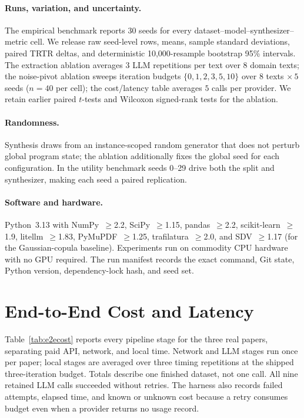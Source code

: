 \documentclass[letterpaper]{article} %
\begin{document}
\paragraph{Runs, variation, and uncertainty.} The empirical benchmark reports
30 seeds for every dataset--model--synthesizer--metric cell. We release raw
seed-level rows, means, sample standard deviations, paired TRTR deltas, and
deterministic 10,000-resample bootstrap 95\% intervals. The extraction ablation
averages $3$ LLM repetitions per text over $8$ domain texts; the noise-pivot ablation sweeps
iteration budgets $\{0,1,2,3,5,10\}$ over $8$ texts $\times\,5$ seeds
($n{=}40$ per cell); the cost/latency table averages $5$ calls per provider. We
retain earlier paired $t$-tests and Wilcoxon signed-rank tests for the ablation.

\paragraph{Randomness.} Synthesis draws from an instance-scoped random generator
that does not perturb global program state; the ablation additionally fixes the
global seed for each configuration. In the utility benchmark seeds 0--29 drive
both the split and synthesizer, making each seed a paired replication.

\paragraph{Software and hardware.} Python~3.13 with NumPy~$\ge$2.2,
SciPy~$\ge$1.15, pandas~$\ge$2.2, scikit-learn~$\ge$1.9, litellm~$\ge$1.83,
PyMuPDF~$\ge$1.25, trafilatura~$\ge$2.0, and SDV~$\ge$1.17 (for the
Gaussian-copula baseline). Experiments run on commodity CPU hardware with no GPU
required. The run manifest records the exact command, Git state, Python
version, dependency-lock hash, and seed set.

\section{End-to-End Cost and Latency}
\label{app:e2ecost}
Table~\ref{tab:e2ecost} reports every pipeline stage for the three real papers,
separating paid API, network, and local time. Network and LLM stages run once
per paper; local stages are averaged over three timing repetitions at the
shipped three-iteration budget. Totals describe one finished dataset, not one
call. All nine retained LLM calls succeeded without retries. The harness also
records failed attempts, elapsed time, and known or unknown cost because a
retry consumes budget even when a provider returns no usage record.
\end{document}
